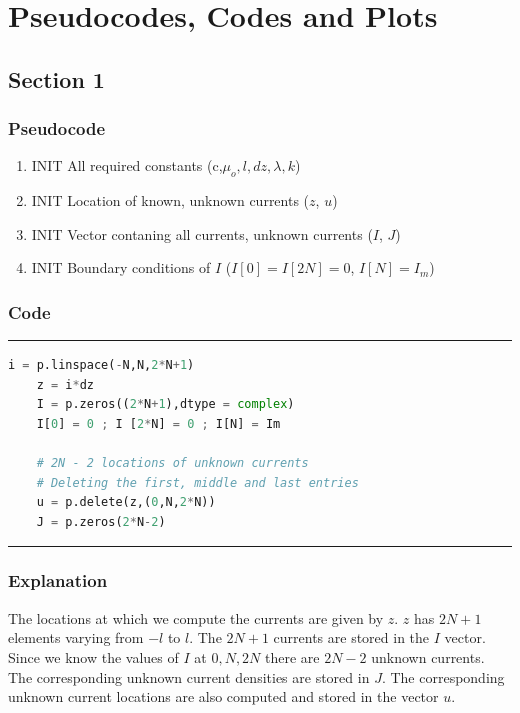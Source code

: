 \documentclass[12pt, a4paper]{article}
\begin{document}
\section{Pseudocodes, Codes and Plots}
\subsection{Section 1}
\subsubsection{Pseudocode}

\begin{enumerate}

  \item \quad INIT All required constants (c,$\mu_{o},l,dz,\lambda,k$)
  \item \quad INIT Location of known, unknown currents ($z$, $u$)
  \item \quad INIT Vector contaning all currents, unknown currents ($I$, $J$)
  \item \quad INIT Boundary conditions of $I$ ($I[0]=I[2N]=0$, $I[N]=I_{m}$)
\end{enumerate}

\subsubsection{Code}
\vspace*{0.4cm}
\hrule
    \begin{lstlisting}[language=Python]
    i = p.linspace(-N,N,2*N+1)
    z = i*dz
    I = p.zeros((2*N+1),dtype = complex)
    I[0] = 0 ; I [2*N] = 0 ; I[N] = Im
    
    # 2N - 2 locations of unknown currents
    # Deleting the first, middle and last entries
    u = p.delete(z,(0,N,2*N))           
    J = p.zeros(2*N-2)
    \end{lstlisting}
\hrule
\subsubsection{Explanation}
The locations at which we compute the currents are given by $z$. $z$ has $2N+1$ elements varying from $-l$ to $l$.
The $2N+1$ currents are stored in the $I$ vector. Since we know the values of $I$ at $0,N,2N$ there are $2N-2$ unknown currents. The corresponding unknown current densities are stored in $J$. The corresponding unknown current locations are also computed and stored in the vector $u$.
\end{document}
